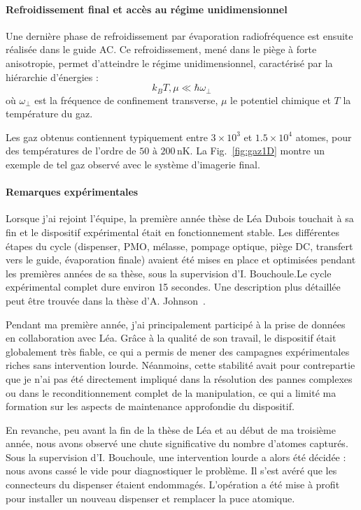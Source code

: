 \paragraph{Refroidissement final et accès au régime unidimensionnel}
Une dernière phase de refroidissement par évaporation radiofréquence est ensuite réalisée dans le guide AC. Ce refroidissement, mené dans le piège à forte anisotropie, permet d’atteindre le régime unidimensionnel, caractérisé par la hiérarchie d’énergies :
\[
k_B T, \mu \ll \hbar \omega_\perp
\]
où \( \omega_\perp \) est la fréquence de confinement transverse, \( \mu \) le potentiel chimique et \( T \) la température du gaz.

Les gaz obtenus contiennent typiquement entre \( 3 \times 10^3 \) et \( 1.5 \times 10^4 \) atomes, pour des températures de l’ordre de \( 50 \text{ à } 200\,\mathrm{nK} \). La Fig.~\ref{fig:gaz1D} montre un exemple de tel gaz observé avec le système d’imagerie final.


\paragraph{Remarques expérimentales}
Lorsque j’ai rejoint l’équipe, la première année thèse de Léa Dubois touchait à sa fin et le dispositif expérimental était en fonctionnement stable. Les différentes étapes du cycle (dispenser, PMO, mélasse, pompage optique, piège DC, transfert vers le guide, évaporation finale) avaient été mises en place et optimisées pendant les premières années de sa thèse, sous la supervision d’I. Bouchoule.Le cycle expérimental complet dure environ 15 secondes. Une description plus détaillée peut être trouvée dans la thèse d’A. Johnson~\cite{Johnson2016}.


Pendant ma première année, j’ai principalement participé à la prise de données en collaboration avec Léa. Grâce à la qualité de son travail, le dispositif était globalement très fiable, ce qui a permis de mener des campagnes expérimentales riches sans intervention lourde. Néanmoins, cette stabilité avait pour contrepartie que je n’ai pas été directement impliqué dans la résolution des pannes complexes ou dans le reconditionnement complet de la manipulation, ce qui a limité ma formation sur les aspects de maintenance approfondie du dispositif.

En revanche, peu avant la fin de la thèse de Léa et au début de ma troisième année, nous avons observé une chute significative du nombre d’atomes capturés. Sous la supervision d’I. Bouchoule, une intervention lourde a alors été décidée : nous avons cassé le vide pour diagnostiquer le problème. Il s’est avéré que les connecteurs du dispenser étaient endommagés. L’opération a été mise à profit pour installer un nouveau dispenser et remplacer la puce atomique.

